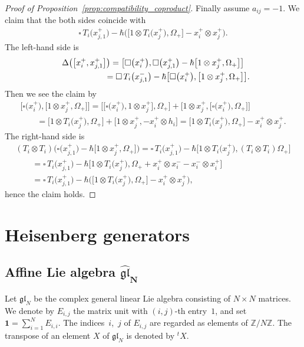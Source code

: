 \documentclass[10pt,a4paper]{amsart}
\theoremstyle{definition}
\numberwithin{equation}{section}
\newcommand{\bbZ}{\mathbb{Z}}
\newcommand{\gl}{\mathfrak{gl}}
\newcommand{\bfid}{\mathbf{1}}
\begin{document}
\begin{proof}[Proof of Proposition~\ref{prop:compatibility_coproduct}]
Finally assume $a_{ij}=-1$. We claim that the both sides coincide with
\begin{gather*}
\square\,T_i\big(x_{j,1}^+\big) -\hbar \big(\big[1 \otimes T_i\big(x_j^+\big), \Omega_+\big] - x_i^+ \otimes x_j^+\big).
\end{gather*}
The left-hand side is
\begin{gather*}
\Delta\big(\big[x_i^+, x_{j,1}^+\big]\big) = \big[\square\big(x_i^+\big), \square\big(x_{j,1}^+\big) - \hbar \big[1 \otimes x_j^+,\Omega_+\big]\big]\\
\hphantom{\Delta\big(\big[x_i^+, x_{j,1}^+\big]\big)}{} = \square\,T_i\big(x_{j,1}^-\big) - \hbar \big[\square\big(x_i^+\big),\big[1 \otimes x_j^+,\Omega_+\big]\big].
\end{gather*}
Then we see the claim by
\begin{gather*}
\big[\square\big(x_i^+\big),\big[1 \otimes x_j^+,\Omega_+\big]\big]=\big[\big[\square\big(x_i^+\big),1 \otimes x_j^+\big],\Omega_+\big] + \big[1 \otimes x_j^+,\big[\square\big(x_i^+\big),\Omega_+\big]\big] \\
\qquad {}= \big[1 \otimes T_i\big(x_j^+\big), \Omega_+\big] + \big[1 \otimes x_j^+, -x_i^+ \otimes h_i\big] = \big[1 \otimes T_i\big(x_j^+\big), \Omega_+\big] - x_i^+ \otimes x_j^+.
\end{gather*}
The right-hand side is
\begin{gather*}
(T_i \otimes T_i)\big(\square\big(x_{j,1}^+\big)-\hbar\big[1 \otimes x_j^+,\Omega_+\big]\big) = \square\,T_i\big(x_{j,1}^+\big) - \hbar\big[1 \otimes T_i\big(x_j^+\big), (T_i \otimes T_i)\Omega_+\big]\\
\qquad {}= \square\,T_i\big(x_{j,1}^+\big) - \hbar\big[1 \otimes T_i\big(x_j^+\big), \Omega_+ + x_i^+ \otimes x_i^- - x_i^- \otimes x_i^+\big]\\
\qquad{} = \square\,T_i\big(x_{j,1}^+\big) - \hbar\big(\big[1 \otimes T_i\big(x_j^+\big), \Omega_+\big] - x_i^+ \otimes x_j^+\big),
\end{gather*}
hence the claim holds.
\end{proof}

\section{Heisenberg generators}\label{section4}

\subsection[Affine Lie algebra $\hat{\gl}_N$]{Affine Lie algebra $\boldsymbol{\hat{\gl}_N}$}
Let $\gl_N$ be the complex general linear Lie algebra consisting of $N \times N$ matrices. We denote by $E_{i,j}$ the matrix unit with $(i,j)$-th entry~$1$, and set $\bfid = \sum\limits_{i=1}^N E_{i,i}$. The indices~$i$,~$j$ of $E_{i,j}$ are regarded as elements of $\bbZ/N\bbZ$. The transpose of an element $X$ of $\gl_N$ is denoted by ${}^t X$.
\end{document}
